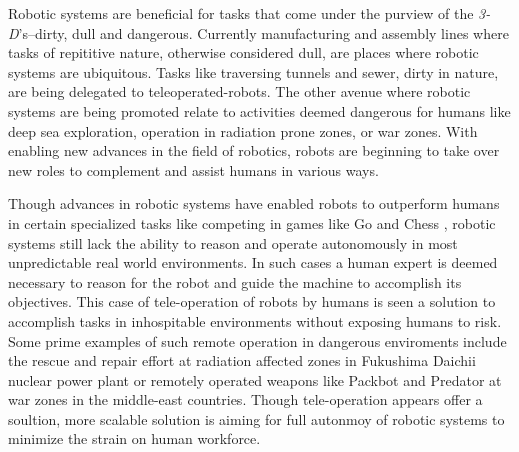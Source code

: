 \documentclass {udthesis}
\begin{document}
Robotic systems are beneficial for tasks that come under the purview of the \emph{3-D}'s--dirty, dull and dangerous. Currently manufacturing and assembly lines where tasks of repititive nature, otherwise considered dull, are places where robotic systems are ubiquitous. Tasks like traversing tunnels and sewer, dirty in nature, are being delegated to teleoperated-robots. The other avenue where robotic systems are being promoted relate to activities deemed dangerous for humans like deep sea exploration, operation in radiation prone zones, or war zones. With enabling new advances in the field of robotics, robots are beginning to take over new roles to complement and assist humans in various ways.

Though advances in robotic systems have enabled robots to outperform humans in certain specialized tasks like competing in 
games like Go \cite{deepmind} and Chess \cite{deepblue}, robotic systems still lack the ability to reason and operate
autonomously in most unpredictable real world environments. 
In such cases a human expert is deemed necessary to reason for the robot and guide the machine
to accomplish its objectives. This case of tele-operation of robots by humans is seen a solution to accomplish
tasks in inhospitable environments without exposing humans to risk. Some prime examples of such remote operation in
dangerous enviroments include the rescue and repair effort at radiation affected zones in Fukushima Daichii nuclear power plant \cite{fukushima} or remotely operated weapons like Packbot \cite{packbot} and Predator \cite{predator}
at war zones in the middle-east countries. Though tele-operation appears offer a soultion, more scalable solution
is aiming for full autonmoy of robotic systems to minimize the strain on human workforce.
 

\printglossary[type=\acronymtype]                  
\end{document}
